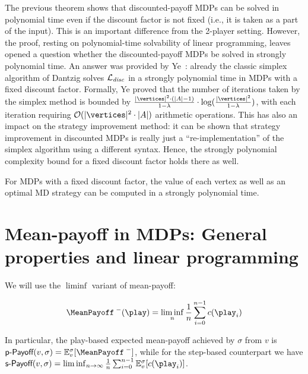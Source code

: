 The previous theorem shows that discounted-payoff MDPs can be solved in 
polynomial time even if the discount factor is not fixed (i.e., it is taken as 
a part of the input). This is an important difference from the 2-player 
setting. However, the proof, resting on polynomial-time solvability of linear 
programming, leaves opened a question whether the discounted-payoff 
MDPs be solved in strongly polynomial time.  An answer was provided by Ye~\cite{Ye:2011}: already the classic simplex 
algorithm of Dantzig solves $\mathcal{L}_{\mathit{disc}}$ in a strongly 
polynomial time in MDPs with a fixed discount factor. Formally, Ye proved that 
the number of iterations taken by the simplex method is bounded by 
$\frac{|\vertices|^2\cdot (|\actions|-1)}{1-\lambda}\cdot 
\log(\frac{|\vertices|^2}{1-\lambda})$, with each iteration requiring  
$\mathcal{O}(|\vertices|^2\cdot |\actions|)$ arithmetic operations. This has 
also an impact on the strategy improvement method: it can be shown that strategy 
improvement in discounted MDPs is really just a ``re-implementation'' of the 
simplex algorithm using a different syntax. Hence, the strongly polynomial 
complexity bound for a fixed discount factor holds there as well.

\begin{theorem}
For MDPs with a fixed discount factor, the value of each vertex as well as an 
optimal MD strategy can be computed in a strongly polynomial time.
\end{theorem}

\section{Mean-payoff in MDPs: General properties and linear programming}

\newcommand{\MeanPayoffOld}{\MeanPayoff}

We will use the $\liminf$ variant of mean-payoff:

\[
\MeanPayoffInf(\play) = \liminf_n \frac{1}{n} \sum_{i = 0}^{n-1} c(\play_i)
\]

In particular, the play-based expected mean-payoff achieved by $ \sigma $ from $ v $ is $ \playPay(v, \sigma) = \expv_v^\sigma[\MeanPayoffInf] $, while for the step-based counterpart we have $ \stepPay(v, \sigma) = \liminf_{n \rightarrow \infty} \frac{1}{n} \sum_{i=0}^{n-1} \expv_v^\sigma[\colouring(\play_i)]$.

